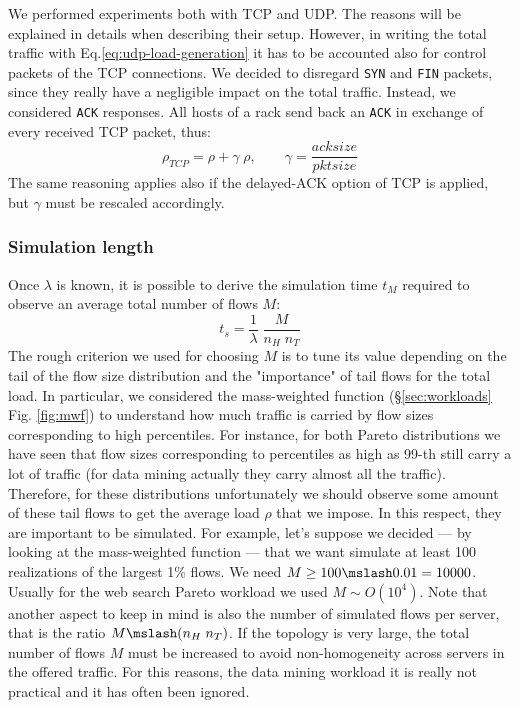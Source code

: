 We performed experiments both with TCP and UDP. The reasons will be explained in details when describing their setup. However, in writing the total traffic with Eq.\eqref{eq:udp-load-generation} it has to be accounted also for control packets of the TCP connections. We decided to disregard \texttt{SYN} and \texttt{FIN} packets, since they really have a negligible impact on the total traffic.  Instead, we considered \texttt{ACK} responses. All hosts of a rack send back an \texttt{ACK} in exchange of every received TCP packet, thus:
\begin{equation}
	\rho_{TCP} = \rho + \gamma \; \rho, \qquad \gamma = \dfrac{acksize}{pktsize}
\end{equation}
The same reasoning applies also if the delayed-ACK option of TCP is applied, but $\gamma$ must be rescaled accordingly.  \\
\subsubsection{Simulation length}
Once $\lambda$ is known, it is possible to derive the simulation time $t_M$ required to observe an average total number of flows $M$:
\[
t_s = \dfrac{1}{\lambda}\;\frac{M}{n_H \; n_T}
\]
The rough criterion we used for choosing $M$ is to tune its value depending on the tail of the flow size distribution and the "importance" of tail flows for the total load. In particular, we considered the mass-weighted function (\S \ref{sec:workloads} Fig. \ref{fig:mwf}) to understand how much traffic is carried by flow sizes corresponding to high percentiles. For instance, for both Pareto distributions we have seen that flow sizes corresponding to percentiles as high as 99-th still carry a lot of traffic (for data mining actually they carry almost all the traffic). Therefore, for these distributions unfortunately we should observe some amount of these tail flows to get the average load $\rho$ that we impose. In this respect, they are important to be simulated. For example, let's suppose we decided --- by looking at the mass-weighted function --- that we want simulate at least 100 realizations of the largest 1\% flows. We need $M \ge 100 \mslash 0.01 = 10000$. Usually for the web search Pareto workload we used $M \sim O(10^{4})$. Note that another aspect to keep in mind is also the number of simulated flows per server, that is the ratio $M \mslash (n_H \; n_T)$. If the topology is very large, the total number of flows $M$ must be increased to avoid non-homogeneity across servers in the offered traffic. For this reasons, the data mining workload it is really not practical and it has often been ignored. 
